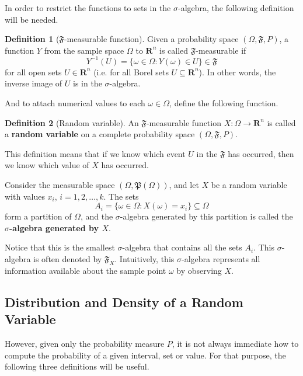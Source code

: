 \documentclass[12pt,a4paper]{article}
\theoremstyle{definition}
\newtheorem{definition}{Definition}[section]
\begin{document}
In order to restrict the functions to sets in the $\sigma$-algebra, the following definition will be needed.

\begin{definition}[$\mathfrak{F}$-measurable function]
	Given a probability space $(\Omega, \mathfrak{F}, P)$, a function $Y$ from the sample space $\Omega$ to $\textbf{R}^n$ is called $\mathfrak{F}$-measurable if
	\[
		Y^{-1}(U) = \{ \omega \in \Omega : Y(\omega) \in U\} \in \mathfrak{F}
	\]
	for all open sets $U \in \textbf{R}^n$ (i.e. for all Borel sets $U \subseteq \textbf{R}^n$). In other words, the inverse image of $U$ is in the $\sigma$-algebra.
\end{definition} 

And to attach numerical values to each $\omega \in \Omega$, define the following function.


\begin{definition}[Random variable]
	An $\mathfrak{F}$-measurable function $X: \Omega \longrightarrow \textbf{R}^n$ is called a \textbf{random variable} on a complete probability space $(\Omega, \mathfrak{F}, P)$. 
\end{definition}

This definition means that if we know which event $U$ in the $\mathfrak{F}$ has occurred, then we know which value of $X$ has occurred. 

Consider the measurable space $(\Omega, \mathfrak{P}(\Omega))$, and let $X$ be a random variable with values $x_i$, $i = 1,2, \ldots, k$. The sets
\[
	A_i = \{ \omega \in \Omega : X(\omega) = x_i \} \subseteq \Omega
\]
form a partition of $\Omega$, and the $\sigma$-algebra generated by this partition is called the \textbf{$\sigma$-algebra generated by $X$}.

Notice that this is the smallest $\sigma$-algebra that contains all the sets $A_i$. This $\sigma$-algebra is often denoted by $\mathfrak{F}_X$. Intuitively, this $\sigma$-algebra represents all information available about the sample point $\omega$ by observing $X$. 


\subsection{Distribution and Density of a Random Variable}

However, given only the probability measure $P$, it is not always immediate how to compute the probability of a given interval, set or value. For that purpose, the following three definitions will be useful.
\end{document}
